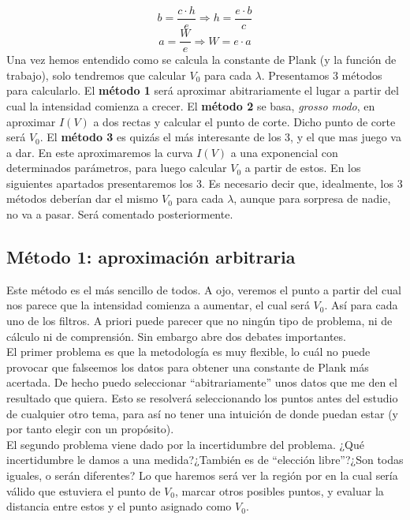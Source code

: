 \documentclass[12pt,a4paper]{article}
\numberwithin{equation}{section}
\numberwithin{table}{section}
\numberwithin{figure}{section}
\begin{document}
\begin{equation}
b = \frac{c \cdot h}{e} \Longrightarrow h = \frac{e\cdot b}{c} 
\end{equation}
\begin{equation}
a = \frac{W}{e} \Longrightarrow W = e \cdot a
\end{equation}
Una vez hemos entendido como se calcula la constante de Plank (y la función de trabajo), solo tendremos que calcular $V_0$ para cada $\lambda$. Presentamos 3 métodos para calcularlo. El \textbf{método 1} será aproximar abitrariamente el lugar a partir del cual la intensidad comienza a crecer. El \textbf{método 2} se basa, \textit{grosso modo}, en aproximar $I(V)$ a dos rectas y calcular el punto de corte. Dicho punto de corte será $V_0$. El \textbf{método 3} es quizás el más interesante de los 3, y el que mas juego va a dar. En este aproximaremos la curva $I(V)$ a una exponencial con determinados parámetros, para luego calcular $V_0$ a partir de estos. En los siguientes apartados presentaremos los 3. Es necesario decir que, idealmente, los 3 métodos deberían dar el mismo $V_0$ para cada $\lambda$, aunque para sorpresa de nadie, no va a pasar. Será comentado posteriormente.


\subsection{Método 1: aproximación arbitraria} \label{Subsec:2.1}

Este método es el más sencillo de todos. A ojo, veremos el punto a partir del cual nos parece que la intensidad comienza a aumentar, el cual será $V_0$. Así para cada uno de los filtros. A priori puede parecer que no ningún tipo de problema, ni de cálculo ni de comprensión. Sin embargo abre dos debates importantes. \\

El primer problema es que la metodología es muy flexible, lo cuál no puede provocar que falseemos los datos para obtener una constante de Plank más acertada. De hecho puedo seleccionar ``abitrariamente'' unos datos que me den el resultado que quiera. Esto se resolverá seleccionando los puntos antes del estudio de cualquier otro tema, para así no tener una intuición de donde puedan estar (y por tanto elegir con un propósito). \\

El segundo problema viene dado por la incertidumbre del problema. ¿Qué incertidumbre le damos a una medida?¿También es de ``elección libre''?¿Son todas iguales, o serán diferentes? Lo que haremos será ver la región por en la cual sería válido que estuviera el punto de $V_0$, marcar otros posibles puntos, y evaluar la distancia entre estos y el punto asignado como $V_0$. 
\end{document}
